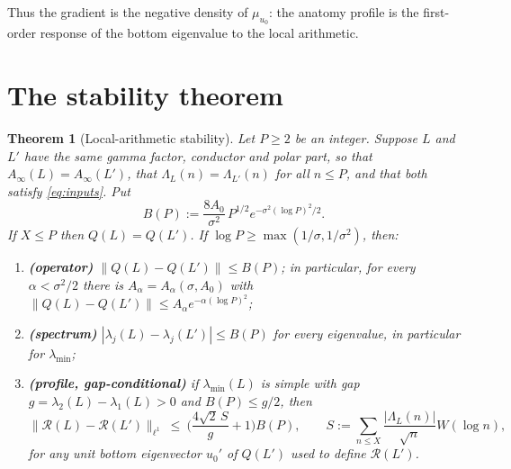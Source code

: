 \documentclass[11pt]{amsart}
\newtheorem{theorem}{Theorem}[section]
\theoremstyle{definition}
\theoremstyle{remark}
\newcommand{\lmin}{\lambda_{\min}}
\newcommand{\Norm}[1]{\lVert #1\rVert}
\newcommand{\Rprof}{\mathcal R}
\begin{document}
Thus the gradient is the negative density of $\mu_{u_0}$: the anatomy profile is the first-order response of
the bottom eigenvalue to the local arithmetic.

\section{The stability theorem}\label{sec:stab}
\begin{theorem}[Local-arithmetic stability]\label{thm:stab}
Let $P\ge2$ be an integer. Suppose $L$ and $L'$ have the same gamma factor, conductor and polar part, so that $A_\infty(L)=A_\infty(L')$,
that $\Lambda_L(n)=\Lambda_{L'}(n)$ for all $n\le P$, and that both satisfy \eqref{eq:inputs}. Put
\[
B(P):=\frac{8A_0}{\sigma^2}\,P^{1/2}e^{-\sigma^2(\log P)^2/2}.
\]
If $X\le P$ then $Q(L)=Q(L')$. If $\log P\ge\max(1/\sigma,1/\sigma^2)$, then:
\begin{enumerate}[label=\textnormal{(\roman*)}]
\item \textbf{(operator)} $\Norm{Q(L)-Q(L')}\le B(P)$; in particular, for every $\alpha<\sigma^2/2$ there is
$A_\alpha=A_\alpha(\sigma,A_0)$ with $\Norm{Q(L)-Q(L')}\le A_\alpha e^{-\alpha(\log P)^2}$;
\item \textbf{(spectrum)} $|\lambda_j(L)-\lambda_j(L')|\le B(P)$ for every eigenvalue, in particular for $\lmin$;
\item \textbf{(profile, gap-conditional)} if $\lmin(L)$ is simple with gap $g=\lambda_2(L)-\lambda_1(L)>0$
and $B(P)\le g/2$, then
\[
\Norm{\Rprof(L)-\Rprof(L')}_{\ell^1}\ \le\ \Big(\frac{4\sqrt2\,S}{g}+1\Big)B(P),\qquad
S:=\sum_{n\le X}\frac{|\Lambda_L(n)|}{\sqrt n}W(\log n),
\]
for any unit bottom eigenvector $u_0'$ of $Q(L')$ used to define $\Rprof(L')$.
\end{enumerate}
\end{theorem}
\end{document}
